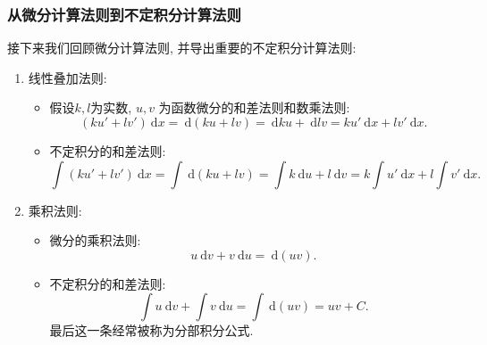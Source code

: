 \documentclass[
10pt,
aspectratio=43,
]{beamer}
\begin{document}
\begin{frame}
	\frametitle{从微分计算法则到不定积分计算法则}
	接下来我们回顾微分计算法则, 并导出重要的不定积分计算法则:\pause
	\begin{block}{}
		\begin{enumerate}
			\item 线性叠加法则:
			      \begin{itemize}
				      \item \pause 假设$k, l$为实数, $u, v$ 为函数微分的和差法则和数乘法则:
				            $$
					            (ku'+lv')\mathrm{~d}x=\mathrm{~d}(ku+ lv) = \mathrm{~d}ku + \mathrm{~d}lv=ku'\mathrm{~d}x+lv'\mathrm{~d}x.
				            $$
				      \item \pause 不定积分的和差法则:
				            $$
					            \int(ku'+lv')\mathrm{~d}x=\int\mathrm{~d}(ku+ lv) = \int k\mathrm{~d}u + l\mathrm{~d}v=k\int u'\mathrm{~d}x+l\int v'\mathrm{~d}x.
				            $$
			      \end{itemize}
			      \pause
			\item 乘积法则:
			      \begin{itemize}
				      \item \pause 微分的乘积法则:
				            $$
					            u\mathrm{~d}v+v\mathrm{~d}u =\mathrm{~d}(uv).
				            $$
				      \item \pause 不定积分的和差法则:
				            $$
					            \int u\mathrm{~d}v+\int v\mathrm{~d}u=\int\mathrm{~d}(uv) = uv + C.
				            $$
				            \pause 最后这一条经常被称为分部积分公式.
			      \end{itemize}
		\end{enumerate}
	\end{block}
\end{frame}
\end{document}

